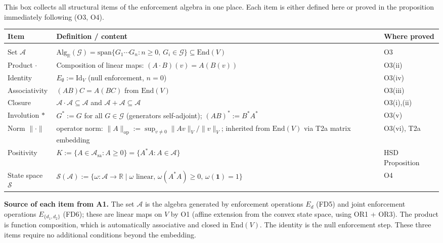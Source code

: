 \documentclass[11pt]{article}
\theoremstyle{remark}
\begin{document}
\begin{tcolorbox}[defbox, title={Definition: The Enforcement Algebra $(\mathcal{A},\,\cdot\,,\,^*,\,\mathcal{S})$}]
\label{def:enforcement_algebra}
This box collects all structural items of the enforcement algebra in one place.  Each item is either defined here or proved in the proposition immediately following (O3, O4).

\medskip
\small
\noindent\begin{tabular}{@{}p{1.8cm}p{5.5cm}p{2.2cm}@{}}
\textbf{Item} & \textbf{Definition / content} & \textbf{Where proved} \\[2pt]
\hline\\[-6pt]
Set $\mathcal{A}$ & $\mathrm{Alg}_{\mathbb{R}}(\mathcal{G}) = \mathrm{span}\{G_1\cdots G_n : n\ge0,\,G_i\in\mathcal{G}\}\subseteq\mathrm{End}(V)$ & O3 \\[3pt]
Product $\cdot$ & Composition of linear maps: $(A\cdot B)(v) = A(B(v))$ & O3(ii) \\[3pt]
Identity & $E_\emptyset := \mathrm{Id}_V$ (null enforcement, $n=0$) & O3(iv) \\[3pt]
Associativity & $(AB)C = A(BC)$ from $\mathrm{End}(V)$ & O3(iii) \\[3pt]
Closure & $\mathcal{A}\cdot\mathcal{A}\subseteq\mathcal{A}$ and $\mathcal{A}+\mathcal{A}\subseteq\mathcal{A}$ & O3(i),(ii) \\[3pt]
Involution $*$ & $G^*:=G$ for all $G \in \mathcal{G}$ (generators self-adjoint); $(AB)^*:=B^*A^*$ & O3(v) \\[3pt]
Norm $\|\cdot\|$ & operator norm: $\|A\|_{\mathrm{op}} := \sup_{v\ne0}\|Av\|_V/\|v\|_V$; inherited from $\mathrm{End}(V)$ via T2a matrix embedding & O3(vi), T2a \\[3pt]
Positivity & $K := \{A\in\mathcal{A}_{\mathrm{sa}} : A\ge0\} = \{A^*A : A\in\mathcal{A}\}$ & HSD Proposition \\[3pt]
State space $\mathcal{S}$ & $\mathcal{S}(\mathcal{A}) := \{\omega:\mathcal{A}\to\mathbb{R} \mid \omega \text{ linear, } \omega(A^*A)\ge0,\,\omega(\mathbf{1})=1\}$ & O4 \\[3pt]
\end{tabular}

\medskip\noindent\textbf{Source of each item from A1.}  The set $\mathcal{A}$ is the algebra generated by enforcement operations $E_d$ (FD5) and joint enforcement operations $E_{\{d_1,d_2\}}$ (FD6); these are linear maps on $V$ by O1 (affine extension from the convex state space, using OR1 + OR3).  The product is function composition, which is automatically associative and closed in $\mathrm{End}(V)$.  The identity is the null enforcement step.  These three items require no additional conditions beyond the embedding.


\end{tcolorbox}
\end{document}
